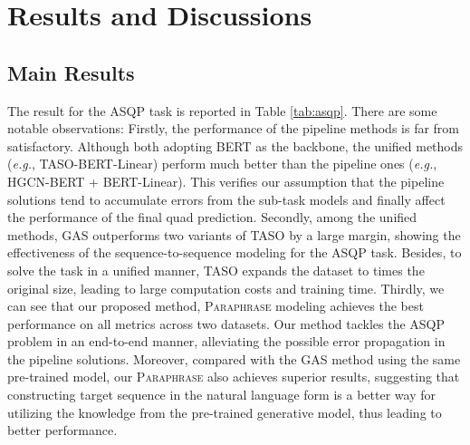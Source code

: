 \documentclass[11pt]{article}
\begin{document}
\section{Results and Discussions}

\subsection{Main Results}

The result for the ASQP task is reported in Table \ref{tab:asqp}. There are some notable observations:
Firstly, the performance of the pipeline methods is far from satisfactory. Although both adopting BERT as the backbone, the unified methods (\textit{e.g.}, TASO-BERT-Linear) perform much better than the pipeline ones (\textit{e.g.}, HGCN-BERT + BERT-Linear). 
This verifies our assumption that the pipeline solutions tend to accumulate errors from the sub-task models and finally affect the performance of the final quad prediction.
Secondly, among the unified methods, GAS outperforms two variants of TASO by a large margin, showing the effectiveness of the sequence-to-sequence modeling for the ASQP task. Besides, to solve the task in a unified manner, TASO expands the dataset to  times the original size, leading to large computation costs and training time.
Thirdly, we can see that our proposed method, \textsc{Paraphrase} modeling achieves the best performance on all metrics across two datasets. Our method tackles the ASQP problem in an end-to-end manner, alleviating the possible error propagation in the pipeline solutions.
Moreover, compared with the GAS method using the same pre-trained model, our \textsc{Paraphrase} also achieves superior results, suggesting that constructing target sequence in the natural language form is a better way for utilizing the knowledge from the pre-trained generative model, thus leading to better performance.
\end{document}
